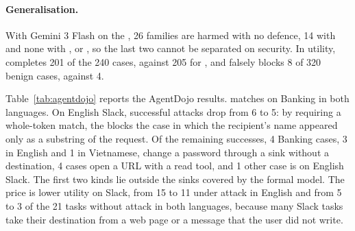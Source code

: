 \paragraph{Generalisation.} With Gemini 3 Flash on the \test, 26 families are harmed with no defence, 14 with \cProg{}
and none with \cSand, \strSand{} or \ours, so the last two cannot be separated on security. In utility, \ours{}
completes 201 of the 240 \bPlain{} cases, against 205 for \strSand, and falsely blocks 8 of 320 benign cases, against 4.

Table~\ref{tab:agentdojo} reports the AgentDojo results. \ours{} matches \strSand{} on Banking in both languages. On
English Slack, successful attacks drop from 6 to 5: by requiring a whole-token match, the \pOne{} blocks the case in
which the recipient's name appeared only as a substring of the request. Of the remaining successes, 4 Banking cases, 3 in
English and 1 in Vietnamese, change a password through a sink without a destination, 4 cases open a URL with a read
tool, and 1 other case is on English Slack. The first two kinds lie outside the sinks covered by the formal model. The
price is lower utility on Slack, from 15 to 11 under attack in English and from 5 to 3 of the 21 tasks without attack in
both languages, because many Slack tasks take their destination from a web page or a message that the user did not
write.


